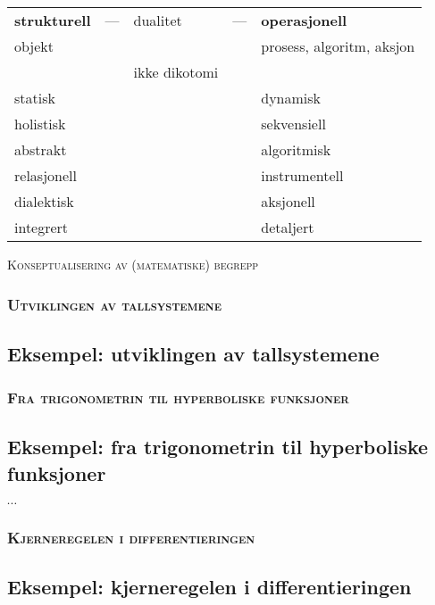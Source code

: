 \documentclass[xcolor=x11names,compress]{beamer}
\renewcommand{\(}{\begin{columns}}
\renewcommand{\)}{\end{columns}}
\newcommand{\<}[1]{\begin{column}{#1}}
\renewcommand{\>}{\end{column}}
\begin{document}
 \begin{frame}
\begin{table}[]
\centering
\label{my-label}
\begin{tabular}{lllll}
{\bf strukturell} & --- & dualitet & --- & {\bf operasjonell }\\
objekt    &  &  &  & prosess, algoritm, aksjon   \\
            &  &ikke dikotomi  &  &               \\
            
  statisk          &  &  &  &  dynamisk            \\
  holistisk & &  & & sekvensiell \\
abstrakt & & & & algoritmisk \\
relasjonell & & & & instrumentell \\
dialektisk & & & & aksjonell \\
integrert & & & & detaljert
\end{tabular}
\end{table}
\centering
{\scshape Konseptualisering av (matematiske) begrepp}
\end{frame}
%
%
\begin{frame}
   \frametitle{\scshape Utviklingen av tallsystemene }
    \subsection{Eksempel: utviklingen av tallsystemene}
      
\end{frame}
%
\begin{frame}
   \frametitle{\scshape  Fra trigonometrin til hyperboliske funksjoner }
    \subsection{Eksempel: fra trigonometrin til hyperboliske funksjoner}
      $\cdots$
\end{frame}
%
%
\begin{frame}
  \frametitle{\scshape   Kjerneregelen i differentieringen}
    \subsection{Eksempel: kjerneregelen i differentieringen}
       
\end{frame}
%
\end{document}
